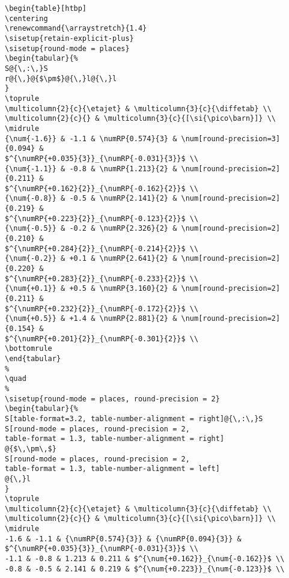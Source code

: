 \documentclass[UKenglish,texlive=2016]{\ATLASLATEXPATH atlasdoc}
\begin{document}
\begin{verbatim}
\begin{table}[htbp]
\centering
\renewcommand{\arraystretch}{1.4}
\sisetup{retain-explicit-plus}
\sisetup{round-mode = places}
\begin{tabular}{%
S@{\,:\,}S
r@{\,}@{$\pm$}@{\,}l@{\,}l
}
\toprule
\multicolumn{2}{c}{\etajet} & \multicolumn{3}{c}{\diffetab} \\
\multicolumn{2}{c}{} & \multicolumn{3}{c}{[\si{\pico\barn}]} \\
\midrule
{\num{-1.6}} & -1.1 & \numRP{0.574}{3} & \num[round-precision=3]{0.094} &
$^{\numRP{+0.035}{3}}_{\numRP{-0.031}{3}}$ \\
{\num{-1.1}} & -0.8 & \numRP{1.213}{2} & \num[round-precision=2]{0.211} &
$^{\numRP{+0.162}{2}}_{\numRP{-0.162}{2}}$ \\
{\num{-0.8}} & -0.5 & \numRP{2.141}{2} & \num[round-precision=2]{0.219} &
$^{\numRP{+0.223}{2}}_{\numRP{-0.123}{2}}$ \\
{\num{-0.5}} & -0.2 & \numRP{2.326}{2} & \num[round-precision=2]{0.210} &
$^{\numRP{+0.284}{2}}_{\numRP{-0.214}{2}}$ \\
{\num{-0.2}} & +0.1 & \numRP{2.641}{2} & \num[round-precision=2]{0.220} &
$^{\numRP{+0.283}{2}}_{\numRP{-0.233}{2}}$ \\
{\num{+0.1}} & +0.5 & \numRP{3.160}{2} & \num[round-precision=2]{0.211} &
$^{\numRP{+0.232}{2}}_{\numRP{-0.172}{2}}$ \\
{\num{+0.5}} & +1.4 & \numRP{2.881}{2} & \num[round-precision=2]{0.154} &
$^{\numRP{+0.201}{2}}_{\numRP{-0.301}{2}}$ \\
\bottomrule
\end{tabular}
%
\quad
%
\sisetup{round-mode = places, round-precision = 2}
\begin{tabular}{%
S[table-format=3.2, table-number-alignment = right]@{\,:\,}S
S[round-mode = places, round-precision = 2,
table-format = 1.3, table-number-alignment = right]
@{$\,\pm\,$}
S[round-mode = places, round-precision = 2,
table-format = 1.3, table-number-alignment = left]
@{\,}l
}
\toprule
\multicolumn{2}{c}{\etajet} & \multicolumn{3}{c}{\diffetab} \\
\multicolumn{2}{c}{} & \multicolumn{3}{c}{[\si{\pico\barn}]} \\
\midrule
-1.6 & -1.1 & {\numRP{0.574}{3}} & {\numRP{0.094}{3}} &
$^{\numRP{+0.035}{3}}_{\numRP{-0.031}{3}}$ \\
-1.1 & -0.8 & 1.213 & 0.211 & $^{\num{+0.162}}_{\num{-0.162}}$ \\
-0.8 & -0.5 & 2.141 & 0.219 & $^{\num{+0.223}}_{\num{-0.123}}$ \\

\end{verbatim}
\end{document}
